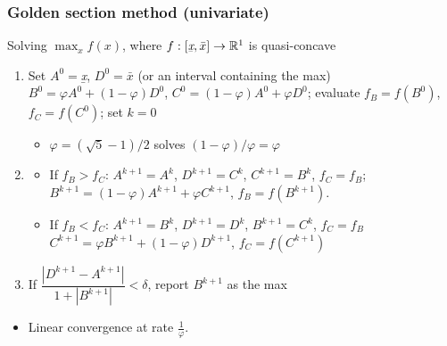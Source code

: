 \documentclass[bigger]{beamer}
\begin{document}
\begin{frame}%

\frametitle{Golden section method (univariate)}

Solving $\max_{x}f\left( x\right) $, where $f:\left[ \text{\emph{\b{x}}},%
\bar{x}\right] \rightarrow \mathbb{R}^{1}$ is quasi-concave

\begin{enumerate}
\item Set $A^{0}=$\emph{\b{x}}, $D^{0}=\bar{x}$ (or an interval containing
the max) \newline
$B^{0}=\varphi A^{0}+\left( 1-\varphi \right) D^{0}$, $C^{0}=\left(
1-\varphi \right) A^{0}+\varphi D^{0}$; \newline
evaluate $f_{B}=f\left( B^{0}\right) $, $f_{C}=f(C^{0})$; set $k=0$

\begin{itemize}
\item $\varphi =\left( \sqrt{5}-1\right) /2$ solves $\left( 1-\varphi
\right) /\varphi =\varphi $
\end{itemize}

\item 

\begin{itemize}
\item If $f_{B}>f_{C}$: $A^{k+1}=A^{k}$, $D^{k+1}=C^{k}$, $C^{k+1}=B^{k}$, $%
f_{C}=f_{B}$;\newline
$B^{k+1}=\left( 1-\varphi \right) A^{k+1}+\varphi C^{k+1}$, $f_{B}=f\left(
B^{k+1}\right) $.
\item If $f_{B}<f_{C}$: $A^{k+1}=B^{k}$, $D^{k+1}=D^{k}$, $B^{k+1}=C^{k}$, $%
f_{C}=f_{B}$\newline
$C^{k+1}=\varphi B^{k+1}+\left( 1-\varphi \right) D^{k+1}$, $f_{C}=f\left(
C^{k+1}\right) $
\end{itemize}

\item If $\dfrac{\left\vert D^{k+1}-A^{k+1}\right\vert }{1+\left\vert
B^{k+1}\right\vert }<\delta $, report $B^{k+1}$ as the max
\end{enumerate}

\begin{itemize}
\item Linear convergence at rate $\frac{1}{\varphi}$.
\end{itemize}


\end{frame}%
\end{document}
